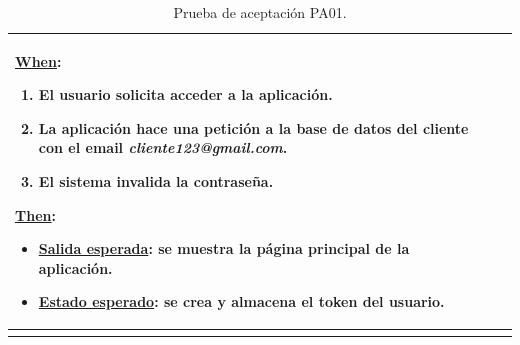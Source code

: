 \documentclass[pdftex,11pt,a4paper]{book}
\begin{document}
\begin{center}
\begin{longtable}{|>{\centering\arraybackslash}X m{2cm}|m{12cm}|}
\underline{When}:
\begin{enumerate}
\vspace{-3mm}
\addtolength{\itemsep}{-3mm}
\item El usuario solicita acceder a la aplicación.
\item La aplicación hace una petición a la base de datos del cliente con el email \textit{cliente123@gmail.com}.
\item El sistema invalida la contraseña.
\end{enumerate}
\break

\underline{Then}:
\vspace{-3mm}
\begin{itemize}
\addtolength{\itemsep}{-3mm}
\item \underline{Salida esperada}: se muestra la página principal de la aplicación.
\item \underline{Estado esperado}: se crea y almacena el token del usuario.
\end{itemize}
\\ \hline

\caption{Prueba de aceptación PA01.} \label{tablalarga:tablaPA01}
\end{longtable}
\end{center}


\renewcommand{\tablename}{Tabla}
\renewcommand{\arraystretch}{1,7}
\end{document}
